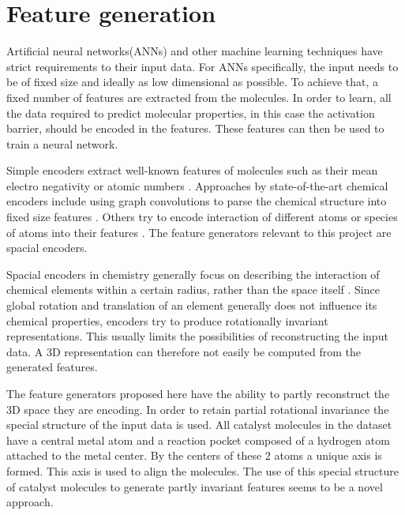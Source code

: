 
\chapter{Feature generation}
\label{ch:features}
Artificial neural networks(ANNs) and other machine learning techniques have strict requirements to their input data.
For ANNs specifically, the input needs to be of fixed size and ideally as low dimensional as possible.
To achieve that, a fixed number of features are extracted from the molecules.
In order to learn, all the data required to predict molecular properties, in this case the activation barrier, should be encoded in the features.
These features can then be used to train a neural network.

Simple encoders extract well-known features of molecules such as their mean electro negativity or atomic numbers \cite{LO20181538}.
Approaches by state-of-the-art chemical encoders include using graph convolutions to parse the chemical structure into fixed size features \cite{GNN_ENCODER}.
Others try to encode interaction of different atoms or species of atoms into their features \cite{PhysRevLett.108.058301}.
The feature generators relevant to this project are spacial encoders.

Spacial encoders in chemistry generally focus on describing the interaction of chemical elements within a certain radius, rather 
than the space itself \cite{Bart_k_2013}.
Since global rotation and translation of an element generally does not influence its chemical properties,
encoders try to produce rotationally invariant representations.
This usually limits the possibilities of reconstructing the input data.
A 3D representation can therefore not easily be computed from the generated features.

The feature generators proposed here have the ability to partly reconstruct the 3D space they are encoding.
In order to retain partial rotational invariance the special structure of the input data is used.
All catalyst molecules in the dataset have a central metal atom and a reaction pocket composed of a hydrogen atom attached to the metal center.
By the centers of these 2 atoms a unique axis is formed.
This axis is used to align the molecules.
The use of this special structure of catalyst molecules to generate partly invariant features seems to be a novel approach.

